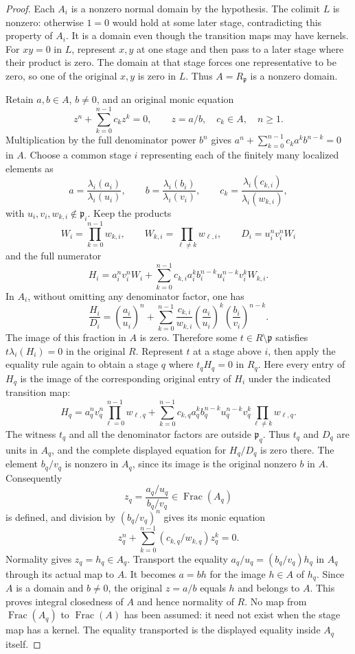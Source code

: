 \begin{proof}
Each $A_i$ is a nonzero normal domain by the hypothesis.
The colimit $L$ is nonzero: otherwise $1=0$ would hold at
some later stage, contradicting this property of $A_i$.
It is a domain even though the transition maps may have kernels.
For $xy=0$ in $L$, represent $x,y$ at one stage and then
pass to a later stage where their product is zero.
The domain at that stage forces one representative to be zero,
so one of the original $x,y$ is zero in $L$.
Thus $A=R_{\mathfrak p}$ is a nonzero domain.

Retain $a,b\in A$, $b\ne0$, and an original monic equation
$$
z^n+\sum_{k=0}^{n-1}c_kz^k=0,
\qquad z=a/b,\quad c_k\in A,\quad n\geq1.
$$
Multiplication by the full denominator power $b^n$ gives
$a^n+\sum_{k=0}^{n-1}c_ka^kb^{n-k}=0$ in $A$.
Choose a common stage $i$ representing each of the finitely
many localized elements as
$$
a=\frac{\lambda_i(a_i)}{\lambda_i(u_i)},\qquad
b=\frac{\lambda_i(b_i)}{\lambda_i(v_i)},\qquad
c_k=\frac{\lambda_i(c_{k,i})}{\lambda_i(w_{k,i})},
$$
with $u_i,v_i,w_{k,i}\notin\mathfrak p_i$.
Keep the products
$$
W_i=\prod_{k=0}^{n-1}w_{k,i},\qquad
W_{k,i}=\prod_{\ell\ne k}w_{\ell,i},\qquad
D_i=u_i^nv_i^nW_i
$$
and the full numerator
$$
H_i=a_i^nv_i^nW_i+
\sum_{k=0}^{n-1}c_{k,i}a_i^kb_i^{n-k}
 u_i^{n-k}v_i^kW_{k,i}.
$$
In $A_i$, without omitting any denominator factor, one has
$$
\frac{H_i}{D_i}
=\left(\frac{a_i}{u_i}\right)^n+
\sum_{k=0}^{n-1}\frac{c_{k,i}}{w_{k,i}}
 \left(\frac{a_i}{u_i}\right)^k
 \left(\frac{b_i}{v_i}\right)^{n-k}.
$$
The image of this fraction in $A$ is zero. Therefore some
$t\in R\setminus\mathfrak p$ satisfies
$t\lambda_i(H_i)=0$ in the original $R$.
Represent $t$ at a stage above $i$, then apply the equality rule
again to obtain a stage $q$ where $t_qH_q=0$ in $R_q$.
Here every entry of $H_q$ is the image of the corresponding
original entry of $H_i$ under the indicated transition map:
$$
H_q=a_q^nv_q^n\prod_{\ell=0}^{n-1}w_{\ell,q}
+\sum_{k=0}^{n-1}c_{k,q}a_q^kb_q^{n-k}u_q^{n-k}v_q^k
 \prod_{\ell\ne k}w_{\ell,q}.
$$
The witness $t_q$ and all the denominator factors are outside
$\mathfrak p_q$. Thus $t_q$ and $D_q$ are units in $A_q$,
and the complete displayed equation for $H_q/D_q$ is zero there.
The element $b_q/v_q$ is nonzero in $A_q$, since its image is
the original nonzero $b$ in $A$. Consequently
$$
z_q=\frac{a_q/u_q}{b_q/v_q}\in\operatorname{Frac}(A_q)
$$
is defined, and division by $(b_q/v_q)^n$ gives its monic equation
$$
z_q^n+\sum_{k=0}^{n-1}(c_{k,q}/w_{k,q})z_q^k=0.
$$
Normality gives $z_q=h_q\in A_q$. Transport the equality
$a_q/u_q=(b_q/v_q)h_q$ in $A_q$ through its actual map to $A$.
It becomes $a=bh$ for the image $h\in A$ of $h_q$.
Since $A$ is a domain and $b\ne0$, the original $z=a/b$ equals
$h$ and belongs to $A$. This proves integral closedness of $A$
and hence normality of $R$.
No map from $\operatorname{Frac}(A_q)$ to
$\operatorname{Frac}(A)$ has been assumed: it need not exist
when the stage map has a kernel. The equality transported is
the displayed equality inside $A_q$ itself.


\end{proof}
